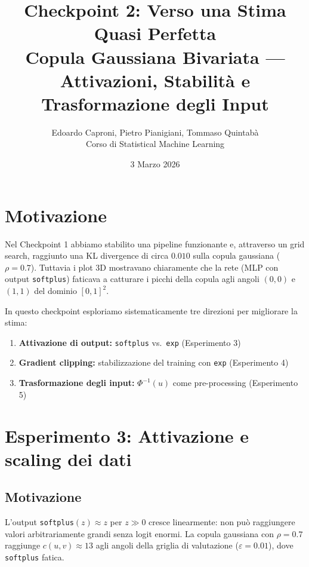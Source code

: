 \documentclass[11pt, a4paper]{article}
\title{Checkpoint 2: Verso una Stima Quasi Perfetta\\
\large Copula Gaussiana Bivariata --- Attivazioni, Stabilità e Trasformazione degli Input}
\author{Edoardo Caproni, Pietro Pianigiani, Tommaso Quintabà\\
\small Corso di Statistical Machine Learning}
\date{3 Marzo 2026}
\begin{document}
\maketitle

\section{Motivazione}

Nel Checkpoint 1 abbiamo stabilito una pipeline funzionante e, attraverso un grid search, raggiunto una KL divergence di circa $0.010$ sulla copula gaussiana ($\rho = 0.7$). Tuttavia i plot 3D mostravano chiaramente che la rete (MLP con output \texttt{softplus}) faticava a catturare i picchi della copula agli angoli $(0,0)$ e $(1,1)$ del dominio $[0,1]^2$.

In questo checkpoint esploriamo sistematicamente tre direzioni per migliorare la stima:
\begin{enumerate}
    \item \textbf{Attivazione di output:} \texttt{softplus} vs.\ \texttt{exp} (Esperimento 3)
    \item \textbf{Gradient clipping:} stabilizzazione del training con \texttt{exp} (Esperimento 4)
    \item \textbf{Trasformazione degli input:} $\Phi^{-1}(u)$ come pre-processing (Esperimento 5)
\end{enumerate}

\section{Esperimento 3: Attivazione e scaling dei dati}

\subsection{Motivazione}

L'output \texttt{softplus}$(z) \approx z$ per $z \gg 0$ cresce linearmente: non può raggiungere valori arbitrariamente grandi senza logit enormi. La copula gaussiana con $\rho = 0.7$ raggiunge $c(u,v) \approx 13$ agli angoli della griglia di valutazione ($\varepsilon = 0.01$), dove \texttt{softplus} fatica.
\end{document}
